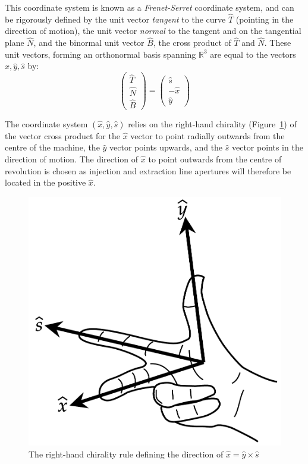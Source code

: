 \documentclass[11pt]{report}
\begin{document}
This coordinate system is known as a {\it Frenet-Serret} coordinate system, and can be rigorously defined by the unit vector {\it tangent} to the curve $\hat T$ (pointing in the direction of motion), the unit vector {\it normal} to the tangent and on the tangential plane $\hat N$, and the binormal unit vector $\hat B$, the cross product of $\hat T$ and $\hat N$. These unit vectors, forming an orthonormal basis spanning $\mathbb{R}^3$ are equal to the vectors $\hat x, \hat y, \hat s$ by:
\begin{equation}
\begin{pmatrix}\hat T\\\hat N\\\hat B \end{pmatrix}=\begin{pmatrix}\hat s\\-\hat x\\\hat y \end{pmatrix}
\end{equation}

The coordinate system $(\hat x, \hat y, \hat s)$ relies on the right-hand chirality (Figure~\ref{fig:rhr}) of the vector cross product for the $\hat x$ vector to point radially outwards from the centre of the machine, the $\hat y$ vector points upwards, and the $\hat s$ vector points in the direction of motion. The direction of $\hat x$ to point outwards from the centre of revolution is chosen as injection and extraction line apertures will therefore be located in the positive $\hat x$.

\begin{figure}[!h]
\begin{center}
\includegraphics[scale=.25]{rhr.pdf}
\caption{The right-hand chirality rule defining the direction of $\hat x = \hat y \times \hat s$}
\label{fig:rhr}
\end{center}
\end{figure}
\end{document}
